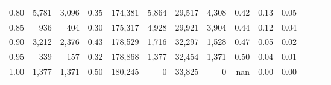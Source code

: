 \begin{tabular}{rrrrrrrrrrrrrr}
0.80 &   5,781 &  3,096 &  0.35 &  174,381 &    5,864 &  29,517 &   4,308 &  0.42 &  0.13 &      0.05 \\
0.85 &     936 &    404 &  0.30 &  175,317 &    4,928 &  29,921 &   3,904 &  0.44 &  0.12 &      0.04 \\
0.90 &   3,212 &  2,376 &  0.43 &  178,529 &    1,716 &  32,297 &   1,528 &  0.47 &  0.05 &      0.02 \\
0.95 &     339 &    157 &  0.32 &  178,868 &    1,377 &  32,454 &   1,371 &  0.50 &  0.04 &      0.01 \\
1.00 &   1,377 &  1,371 &  0.50 &  180,245 &        0 &  33,825 &       0 &   nan &  0.00 &      0.00 \\
\bottomrule
\end{tabular}
